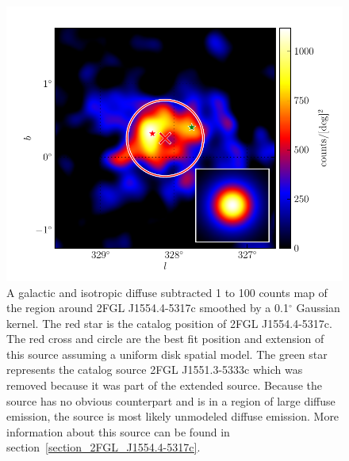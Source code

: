 \documentclass[12pt,preprint]{aastex}
\newcommand{\gev}{\text{GeV}\xspace}
\renewcommand{\deg}{\ensuremath{^\circ}\xspace}
\begin{document}
\begin{figure}
  \begin{center}
    \includegraphics[type=pdf,ext=.pdf,read=.pdf]{source_plots/source_1FGL_J1554.0-5345c}
  \end{center}
  \caption{
  A galactic and isotropic diffuse subtracted 1 \gev to 100 \gev
  counts map of the region around 2FGL J1554.4-5317c smoothed by a
  0.1\deg Gaussian kernel.  The red star is the catalog position of
  2FGL J1554.4-5317c.  The red cross and circle are the best
  fit position and extension of this source assuming a uniform disk
  spatial model.  The green star represents the catalog source 2FGL
  J1551.3-5333c which was removed because it was part of
  the extended source.  Because the source has no obvious counterpart and
  is in a region of large diffuse emission, the source is most likely
  unmodeled diffuse emission.  More information about this source can be
  found in section~\ref{section_2FGL_J1554.4-5317c}.
  }
  \label{1FGL_J1554.0-5345c}
\end{figure}
\end{document}
